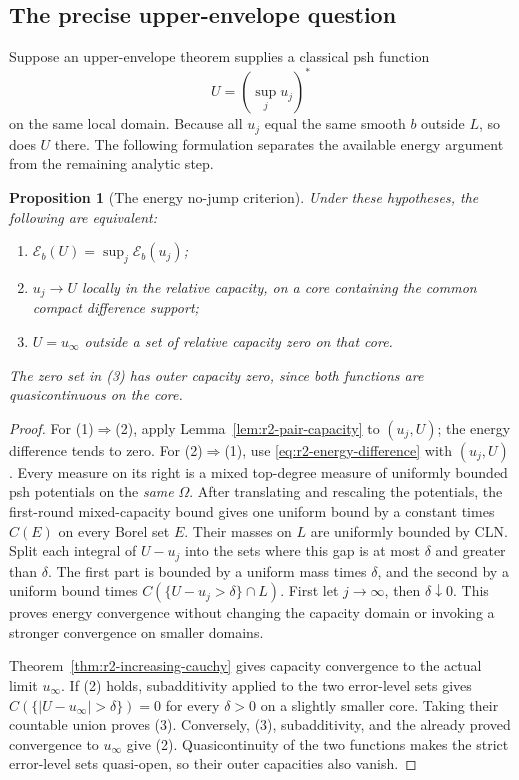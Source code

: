 \documentclass[11pt,a4paper]{article}
\numberwithin{equation}{section}
\newtheorem{proposition}[theorem]{Proposition}
\theoremstyle{definition}
\theoremstyle{remark}
\begin{document}
\subsection{The precise upper-envelope question}

Suppose an upper-envelope theorem supplies a classical psh function
\[
 U=(\sup_j u_j)^*
\]
on the same local domain. Because all $u_j$ equal the same smooth
$b$ outside $L$, so does $U$ there. The following formulation separates
the available energy argument from the remaining analytic step.

\begin{proposition}[The energy no-jump criterion]
\label{prop:r2-envelope-energy-criterion}
Under these hypotheses, the following are equivalent:
\begin{enumerate}
\item $\mathcal E_b(U)=\sup_j\mathcal E_b(u_j)$;
\item $u_j\to U$ locally in the relative capacity, on a core
      containing the common compact difference support;
\item $U=u_\infty$ outside a set of relative capacity zero on that core.
\end{enumerate}
The zero set in (3) has outer capacity zero, since both functions
are quasicontinuous on the core.
\end{proposition}

\begin{proof}
For (1)$\Rightarrow$(2), apply
Lemma~\ref{lem:r2-pair-capacity} to $(u_j,U)$; the energy difference
tends to zero. For (2)$\Rightarrow$(1), use
\eqref{eq:r2-energy-difference} with $(u_j,U)$. Every measure on its
right is a mixed top-degree measure of uniformly bounded psh
potentials on the \emph{same} $\Omega$. After translating and
rescaling the potentials, the first-round mixed-capacity bound gives
one uniform bound by a constant times $C(E)$ on every Borel set $E$.
Their masses on $L$ are uniformly bounded by CLN. Split each integral
of $U-u_j$ into the sets where this gap is at most $\delta$ and
greater than $\delta$. The first part is bounded by a uniform mass
times $\delta$, and the second by a uniform bound times
$C(\{U-u_j>\delta\}\cap L)$. First let $j\to\infty$, then
$\delta\downarrow0$. This proves energy convergence without changing
the capacity domain or invoking a stronger convergence on smaller
domains.

Theorem~\ref{thm:r2-increasing-cauchy} gives capacity convergence to
the actual limit $u_\infty$. If (2) holds, subadditivity applied to
the two error-level sets gives $C(\{|U-u_\infty|>\delta\})=0$
for every $\delta>0$ on a slightly smaller core. Taking their
countable union proves (3). Conversely, (3), subadditivity, and the
already proved convergence to $u_\infty$ give (2). Quasicontinuity
of the two functions makes the strict error-level sets quasi-open,
so their outer capacities also vanish.
\end{proof}
\end{document}
